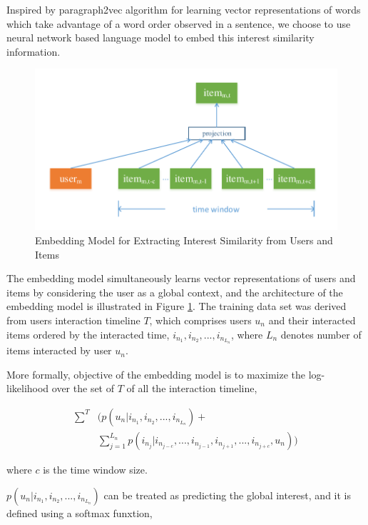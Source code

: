 \documentclass{sig-alternate-05-2015}
\begin{document}
Inspired by paragraph2vec algorithm \cite{le2014distributed} for learning vector representations of words
which take advantage of a word order observed in a sentence,
we choose to use neural network based language model
to embed this interest similarity information.

\begin{figure}[htbp]
	\centering
	\includegraphics[scale=0.55]{images/2.pdf}
	\caption{Embedding Model for Extracting Interest Similarity from Users and Items}
	\label{fig:embedding}
\end{figure}

The embedding model simultaneously learns vector representations of users and items
by considering the user as a global context,
and the architecture of the embedding model is illustrated in Figure \ref{fig:embedding}.
The training data set was derived from users interaction timeline $T$,
which comprises users $u_n$ and their interacted items
ordered by the interacted time,
$i_{n_1}, i_{n_2}, ..., i_{n_{L_n}}$,
where $L_n$ denotes number of items interacted by user $u_n$.

More formally, objective of the embedding model is to
maximize the log-likelihood over the set of $T$ of all the interaction timeline,

\begin{equation}
\begin{aligned}
	\sum^{T} &\bigg( p(u_n | i_{n_1}, i_{n_2}, ..., i_{n_{L_n}}) + \\
			 &\sum_{j=1}^{L_n} p(i_{n_j} | i_{n_{j-c}}, ..., i_{n_{j-1}}, i_{n_{j+1}},..., i_{n_{j+c}}, u_n) \bigg)
\end{aligned}
\end{equation}

where $c$ is the time window size.

$p(u_n | i_{n_1}, i_{n_2}, ..., i_{n_{L_n}})$ can be treated as predicting the global interest,
and it is defined using a softmax funxtion,
\end{document}
